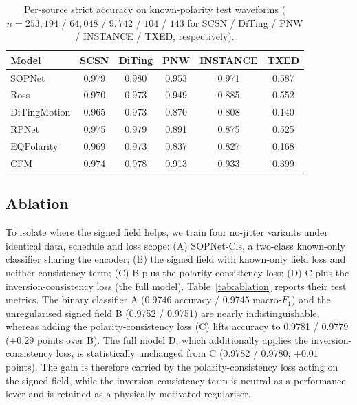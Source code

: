 \documentclass[11pt]{article}
\begin{document}
\begin{table}[t]
  \centering
  \caption{Per-source strict accuracy on known-polarity test waveforms
  ($n = 253{,}194$ / $64{,}048$ / $9{,}742$ / $104$ / $143$ for SCSN /
  DiTing / PNW / INSTANCE / TXED, respectively).}
  \label{tab:source}
  \small
  \begin{tabular}{lccccc}
    \toprule
    Model & SCSN & DiTing & PNW & INSTANCE & TXED \\
    \midrule
    SOPNet       & 0.979 & 0.980 & 0.953 & 0.971 & 0.587 \\
    Ross         & 0.970 & 0.973 & 0.949 & 0.885 & 0.552 \\
    DiTingMotion & 0.965 & 0.973 & 0.870 & 0.808 & 0.140 \\
    RPNet        & 0.975 & 0.979 & 0.891 & 0.875 & 0.525 \\
    EQPolarity   & 0.969 & 0.973 & 0.837 & 0.827 & 0.168 \\
    CFM          & 0.974 & 0.978 & 0.913 & 0.933 & 0.399 \\
    \bottomrule
  \end{tabular}
\end{table}

\subsection{Ablation}
\label{sec:ablation}

To isolate where the signed field helps, we train four no-jitter variants under
identical data, schedule and loss scope: (A) SOPNet-Cls, a two-class
known-only classifier sharing the encoder; (B) the signed field with
known-only field loss and neither consistency term; (C) B plus the
polarity-consistency loss; (D) C plus the inversion-consistency loss (the full
model). Table~\ref{tab:ablation} reports their test metrics. The binary
classifier A (0.9746 accuracy / 0.9745 macro-$F_1$) and the unregularised
signed field B (0.9752 / 0.9751) are nearly indistinguishable, whereas
adding the polarity-consistency loss (C) lifts accuracy to 0.9781 / 0.9779
($+0.29$ points over B). The full model D, which additionally applies the
inversion-consistency loss, is statistically unchanged from C
(0.9782 / 0.9780; $+0.01$ points). The gain is therefore carried by the
polarity-consistency loss acting on the signed field, while the
inversion-consistency term is neutral as a performance lever and is retained
as a physically motivated regulariser.
\end{document}

